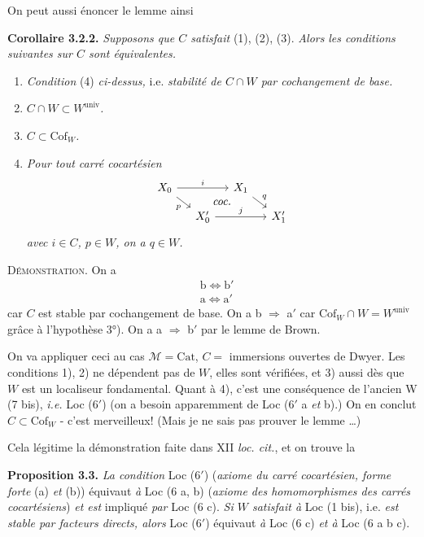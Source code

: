 \documentclass[11pt]{article}
\newcommand{\msp}[1]{\marginpar{\footnotesize [#1]}}
\newcommand{\Cof}{\mathrm{Cof}}
\newcommand{\univ}{\mathrm{univ}}
\begin{document}
On peut aussi énoncer le lemme ainsi

\textbf{Corollaire 3.2.2.} \textit{Supposons que $C$ satisfait} (1), (2), (3). \textit{Alors}
\msp{page 21}\textit{les conditions suivantes sur $C$ sont équivalentes.}
\begin{enumerate}
\item[a)] \textit{Condition} (4) \textit{ci-dessus,} i.e. \textit{stabilité de $C \cap W$ par cochangement de base.}
\item[a$'$)] \textit{$C \cap W \subset W^{\univ}$.}
\item[b)] \textit{$C \subset \Cof_W$.}
\item[b$'$)] \textit{Pour tout carré cocartésien}
\[
\begin{tikzcd}[ampersand replacement=\&, row sep=small, column sep=small]
X_0 \arrow[rr, "i"] \arrow[dr, "p"'] \arrow[to=2-4, phantom, "\textit{coc.}" description] \& \& X_1 \arrow[dr, "q"] \& \\
\& X'_0 \arrow[rr, "j"] \& \& X'_1
\end{tikzcd}
\]
\textit{avec $i \in C$, $p \in W$, on a $q \in W$.}
\end{enumerate}
\textsc{Démonstration}. On a
\[
\begin{aligned}
&\text{b} \iff \text{b}'\\
&\text{a} \iff \text{a}'
\end{aligned}
\]
car $C$ est stable par cochangement de base. On a b $\Longrightarrow$ a$'$ car $\Cof_W \cap W = W^{\univ}$ grâce à l'hypothèse 3°). On a a $\Longrightarrow$ b$'$ par le lemme de Brown.

On va appliquer ceci au cas $\mathcal{M} = \mathrm{Cat}$, $C =$ immersions ouvertes de Dwyer. Les conditions 1), 2) ne dépendent pas de $W$, elles sont vérifiées, et 3) aussi dès que $W$ est un localiseur fondamental. Quant à 4), c'est une conséquence de l'ancien W (7 bis), \textit{i.e.} Loc (6$'$) (on a
\msp{page 22}besoin apparemment de Loc (6$'$ a \textit{et} b).) On en conclut $C \subset \Cof_W$ - c'est merveilleux! (Mais je ne sais pas prouver le lemme \dots)

Cela légitime la démonstration faite dans XII \textit{loc. cit.}, et on trouve la

\textbf{Proposition 3.3.} \textit{La condition} Loc (6$'$) (\textit{axiome du carré cocartésien, forme forte} (a) \textit{et} (b)) équivaut \textit{à} Loc (6 a, b) (\textit{axiome des homomorphismes des carrés cocartésiens}) \textit{et est} impliqué \textit{par} Loc (6 c). \textit{Si $W$ satisfait à} Loc (1 bis), i.e. \textit{est stable par facteurs directs, alors} Loc (6$'$) équivaut \textit{à} Loc (6 c) \textit{et à} Loc (6 a b c).
\end{document}
